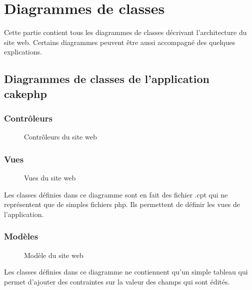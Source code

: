 \chapter{Diagrammes de classes}

Cette partie contient tous les diagrammes de classes décrivant l'architecture du site web. Certains diagrammes peuvent être aussi accompagné des quelques explications.
 
\newpage

\section{Diagrammes de classes de l'application cakephp}

\subsection{Contrôleurs}

\begin{figure}[H]
	\begin{center}\end{center}
	\caption{Contrôleurs du site web}
\end{figure}

\subsection{Vues}

\begin{figure}[H]
	\begin{center}\end{center}
	\caption{Vues du site web}
\end{figure}

Les classes définies dans ce diagramme sont en fait des fichier .cpt qui ne représentent que de simples fichiers php. Ils permettent de définir les vues de l'application.

\subsection{Modèles}

\begin{figure}[H]
	\begin{center}\end{center}
	\caption{Modèle du site web}
\end{figure}

Les classes définies dans ce diagramme ne contiennent qu'un simple tableau qui permet d'ajouter des contraintes sur la valeur des champs qui sont édités.
